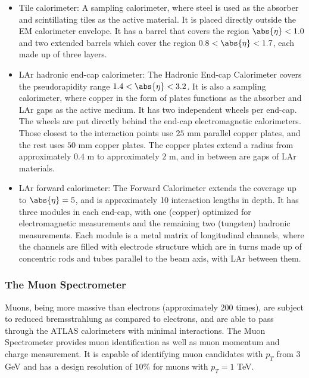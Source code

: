 \begin{itemize}

	\item Tile calorimeter: A sampling calorimeter, where steel is used as the
	      absorber and scintillating tiles as the active material. It is placed directly
	      outside the EM calorimeter envelope. It has a barrel that covers the region
	      $\abs{\eta} < 1.0$ and two extended barrels which cover the region $0.8 <
		      \abs{\eta} < 1.7$, each made up of three layers.


	\item LAr hadronic end-cap calorimeter: The Hadronic End-cap Calorimeter covers
	      the pseudorapidity range $1.4 < \abs{\eta} < 3.2$. It is also a sampling
	      calorimeter, where copper in the form of plates functions as the absorber and
	      LAr gaps as the active medium. It has two independent wheels per end-cap. The
	      wheels are put directly behind the end-cap electromagnetic calorimeters. Those
	      closest to the interaction points use $25$ mm parallel copper plates, and the
	      rest uses $50$ mm copper plates. The copper plates extend a radius from
	      approximately $0.4$ m to approximately $2$ m, and in between are gaps of LAr
	      materials.

	\item LAr forward calorimeter: The Forward Calorimeter extends the coverage up
	      to $\abs{\eta}=5$, and is approximately 10 interaction lengths in depth. It has
	      three modules in each end-cap, with one (copper) optimized for electromagnetic
	      measurements and the remaining two (tungsten) hadronic measurements. Each
	      module is a metal matrix of longitudinal channels, where the channels are
	      filled with electrode structure which are in turns made up of concentric rods
	      and tubes parallel to the beam axis, with LAr between them.

\end{itemize}

\subsubsection{The Muon Spectrometer}\label{s:decmuons}

Muons, being more massive than electrons (approximately $200$ times), are
subject to reduced bremsstrahlung as compared to electrons, and are able to
pass through the ATLAS calorimeters with minimal interactions. The Muon
Spectrometer \cite{lhcaccexp} provides muon identification as well as muon
momentum and charge measurement. It is capable of identifying muon candidates
with $p_T$ from $3$ GeV and has a design resolution of $10\%$ for muons with
$p_T = 1$ TeV.

